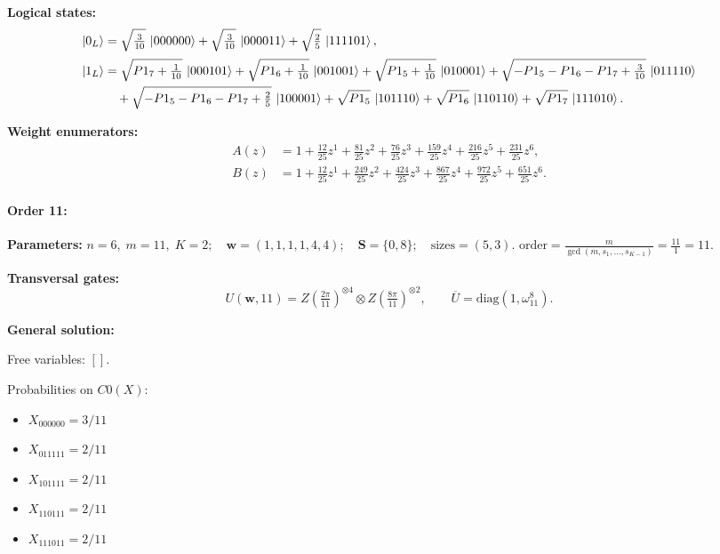 \documentclass[11pt]{article}
\begin{document}
\noindent\textbf{Logical states:}
\begin{align*}
\ket{0_L} &= \sqrt{\tfrac{3}{10}}\,\ket{000000} + \sqrt{\tfrac{3}{10}}\,\ket{000011} + \sqrt{\tfrac{2}{5}}\,\ket{111101},
\\[2pt]
\ket{1_L} &= \sqrt{P1_7 + \tfrac{1}{10}}\,\ket{000101} + \sqrt{P1_6 + \tfrac{1}{10}}\,\ket{001001} + \sqrt{P1_5 + \tfrac{1}{10}}\,\ket{010001} + \sqrt{-P1_5 - P1_6 - P1_7 + \tfrac{3}{10}}\,\ket{011110}\\
&\quad + \sqrt{-P1_5 - P1_6 - P1_7 + \tfrac{2}{5}}\,\ket{100001} + \sqrt{P1_5}\,\ket{101110} + \sqrt{P1_6}\,\ket{110110} + \sqrt{P1_7}\,\ket{111010}.
\end{align*}

\noindent\textbf{Weight enumerators:}
\begin{align*}
A(z) &= 1 + \tfrac{12}{25}z^{1} + \tfrac{81}{25}z^{2} + \tfrac{76}{25}z^{3} + \tfrac{159}{25}z^{4} + \tfrac{216}{25}z^{5} + \tfrac{231}{25}z^{6},\\[2pt]
B(z) &= 1 + \tfrac{12}{25}z^{1} + \tfrac{249}{25}z^{2} + \tfrac{424}{25}z^{3} + \tfrac{867}{25}z^{4} + \tfrac{972}{25}z^{5} + \tfrac{651}{25}z^{6}.
\end{align*}

\paragraph{\textbf{Order 11:}}
\noindent\textbf{Parameters:} $n=6,\; m=11,\; K=2;\quad \mathbf w=(1, 1, 1, 1, 4, 4);\quad \mathbf S=\{0, 8\};\quad \text{sizes}=\left(5, 3\right).$ $\displaystyle \text{order}=\frac{m}{\gcd(m,s_1,\dots,s_{K-1})}=\frac{11}{1}=11.$

\noindent\textbf{Transversal gates:}
\[
    U(\mathbf w,11)=Z \left(\tfrac{2\pi}{11}\right)^{\otimes4} \otimes Z \left(\tfrac{8\pi}{11}\right)^{\otimes2},\qquad
    \overline U=\mathrm{diag}(1,\omega_{11}^{8}).
\]

\noindent\textbf{General solution:}

Free variables: $[]$.

Probabilities on $C0 (X)$:
\begin{itemize}
    \item $X_{000000} = 3/11$
    \item $X_{011111} = 2/11$
    \item $X_{101111} = 2/11$
    \item $X_{110111} = 2/11$
    \item $X_{111011} = 2/11$
\end{itemize}
\end{document}
